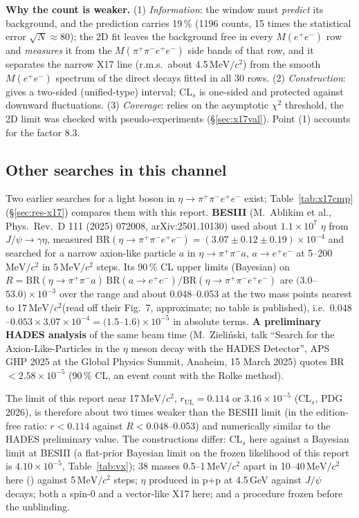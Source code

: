 \documentclass[11pt,a4paper]{article}
\newcommand{\ee}{\ensuremath{e^{+}e^{-}}\xspace}
\newcommand{\pipi}{\ensuremath{\pi^{+}\pi^{-}}\xspace}
\newcommand{\ppee}{\ensuremath{\pi^{+}\pi^{-}e^{+}e^{-}}\xspace}
\newcommand{\Mfour}{\ensuremath{M(\pi^{+}\pi^{-}e^{+}e^{-})}\xspace}
\newcommand{\Mee}{\ensuremath{M(e^{+}e^{-})}\xspace}
\newcommand{\MeVcc}{\ensuremath{\mathrm{MeV}/c^{2}}\xspace}
\newcommand{\code}[1]{\texttt{\detokenize{#1}}}
\begin{document}
\textbf{Why the count is weaker.} (1) \emph{Information}: the window must \emph{predict} its background, and the prediction carries 19\,\%
(1196 counts, 15 times the statistical error $\sqrt N\approx80$); the 2D fit leaves the background free in every \Mee row and \emph{measures} it from
the \Mfour side bands of that row, and it separates the narrow X17 line (r.m.s.\ about 4.5\,\MeVcc) from the smooth \Mee spectrum of the direct
decays fitted in all 30 rows. (2) \emph{Construction}: \code{TRolke} gives a two-sided (unified-type) interval; CL$_s$ is one-sided and protected
against downward fluctuations. (3) \emph{Coverage}: \code{TRolke} relies on the asymptotic $\chi^2$ threshold, the 2D limit was checked with
pseudo-experiments (\S\ref{sec:x17val}). Point (1) accounts for the factor 8.3.

\subsection{Other searches in this channel}
\label{sec:x17other}
Two earlier searches for a light boson in $\eta\to\pipi\ee$ exist; Table~\ref{tab:x17cmp} (\S\ref{sec:res-x17}) compares them with this
report. \textbf{BESIII} (M.~Ablikim et al., Phys.\ Rev.\ D 111 (2025) 072008, arXiv:2501.10130) used about $1.1\times10^7$ $\eta$ from
$J/\psi\to\gamma\eta$, measured BR$(\eta\to\ppee)=(3.07\pm0.12\pm0.19)\times10^{-4}$ and searched for a narrow axion-like particle $a$ in
$\eta\to\pipi a$, $a\to\ee$ at 5--200\,\MeVcc in 5\,\MeVcc steps. Its 90\,\% CL upper limits (Bayesian) on
$R=\mathrm{BR}(\eta\to\pipi a)\,\mathrm{BR}(a\to\ee)/\mathrm{BR}(\eta\to\ppee)$ are $(3.0$--$53.0)\times10^{-3}$ over the range and about
0.048--0.053 at the two mass points nearest to 17\,\MeVcc (read off their Fig.~7, approximate; no table is published), i.e.\
$0.048$--$0.053\times3.07\times10^{-4}=(1.5$--$1.6)\times10^{-5}$ in absolute terms. \textbf{A preliminary HADES analysis} of the same beam time
(M.~Zieli\'nski, talk ``Search for the Axion-Like-Particles in the $\eta$ meson decay with the HADES Detector'', APS GHP 2025 at the Global
Physics Summit, Anaheim, 15 March 2025) quotes BR $<2.58\times10^{-5}$ (90\,\% CL, an event count with the Rolke method).

The limit of this report near 17\,\MeVcc, $r_{\mathrm{UL}}=0.114$ or $3.16\times10^{-5}$ (CL$_s$, PDG 2026), is therefore about two times weaker than the
BESIII limit (in the edition-free ratio: $r<0.114$ against $R<0.048$--0.053) and numerically similar to the HADES preliminary value. The constructions differ: CL$_s$ here against a Bayesian limit at BESIII (a flat-prior
Bayesian limit on the frozen likelihood of this report is $4.10\times10^{-5}$, Table~\ref{tab:vx}); 38 masses 0.5--1\,\MeVcc apart in 10--40\,\MeVcc
here (\code{tables_all/x17d_scan.txt}) against 5\,\MeVcc steps; $\eta$ produced in p+p at 4.5\,GeV against $J/\psi$ decays; both a spin-0 and a
vector-like X17 here; and a procedure frozen before the unblinding.
\end{document}
